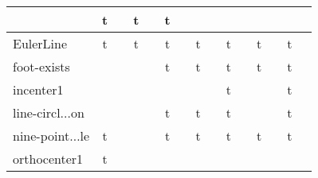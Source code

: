 {\begin{longtable}{|l|*{7}{cr|}}
& \cellcolor{green!20}t & \cellcolor{green!20}{\sl 781} 
& \cellcolor{green!40}t & \cellcolor{green!40}{ 86} 
& \cellcolor{green!10}t & \cellcolor{green!10}{ 4583} 
\\ \hline
\cellcolor{blue!10}EulerLine 
& \cellcolor{green!60}t & \cellcolor{green!60}{\bf 19} 
& \cellcolor{green!20}t & \cellcolor{green!20}{ 544} 
& \cellcolor{green!50}t & \cellcolor{green!50}{ 43} 
& \cellcolor{green!30}t & \cellcolor{green!30}{ 254} 
& \cellcolor{green!20}t & \cellcolor{green!20}{\sl 673} 
& \cellcolor{green!30}t & \cellcolor{green!30}{ 209} 
& \cellcolor{green!60}t & \cellcolor{green!60}{ 14} 
\\ \hline
\cellcolor{blue!10}foot-exists 
& \cellcolor{yellow!25} & \cellcolor{yellow!25}{ 4} 
& \cellcolor{yellow!25} & \cellcolor{yellow!25}{ 17} 
& \cellcolor{green!50}t & \cellcolor{green!50}{\bf 40} 
& \cellcolor{green!30}t & \cellcolor{green!30}{ 242} 
& \cellcolor{green!30}t & \cellcolor{green!30}{\sl 261} 
& \cellcolor{green!40}t & \cellcolor{green!40}{ 75} 
& \cellcolor{green!30}t & \cellcolor{green!30}{ 243} 
\\ \hline
\cellcolor{blue!10}incenter1 
& \cellcolor{yellow!25} & \cellcolor{yellow!25}{ 3} 
& \cellcolor{yellow!25} & \cellcolor{yellow!25}{ 2} 
& \cellcolor{yellow!25} & \cellcolor{yellow!25}{ 9} 
& \cellcolor{yellow!25} & \cellcolor{yellow!25}{ 228} 
& \cellcolor{green!20}t & \cellcolor{green!20}{\bf 470} 
& \cellcolor{yellow!25} & \cellcolor{yellow!25}{ 65} 
& \cellcolor{green!20}t & \cellcolor{green!20}{ 638} 
\\ \hline
\cellcolor{blue!10}line-circl$\ldots$on 
& \cellcolor{yellow!25} & \cellcolor{yellow!25}{ 2} 
& \cellcolor{yellow!25} & \cellcolor{yellow!25}{ 4} 
& \cellcolor{green!40}t & \cellcolor{green!40}{\bf 52} 
& \cellcolor{green!30}t & \cellcolor{green!30}{\sl 242} 
& \cellcolor{green!40}t & \cellcolor{green!40}{ 86} 
& \cellcolor{yellow!25} & \cellcolor{yellow!25}{ 84} 
& \cellcolor{green!30}t & \cellcolor{green!30}{ 247} 
\\ \hline
\cellcolor{blue!10}nine-point$\ldots$le 
& \cellcolor{green!50}t & \cellcolor{green!50}{\bf 24} 
& \cellcolor{yellow!25} & \cellcolor{yellow!25}{ t/o} 
& \cellcolor{green!40}t & \cellcolor{green!40}{ 63} 
& \cellcolor{green!30}t & \cellcolor{green!30}{ 269} 
& \cellcolor{green!20}t & \cellcolor{green!20}{\sl 399} 
& \cellcolor{green!40}t & \cellcolor{green!40}{ 75} 
& \cellcolor{green!50}t & \cellcolor{green!50}{ 25} 
\\ \hline
\cellcolor{blue!10}orthocenter1 
& \cellcolor{green!60}t & \cellcolor{green!60}{\bf 12} 

\end{longtable}}
